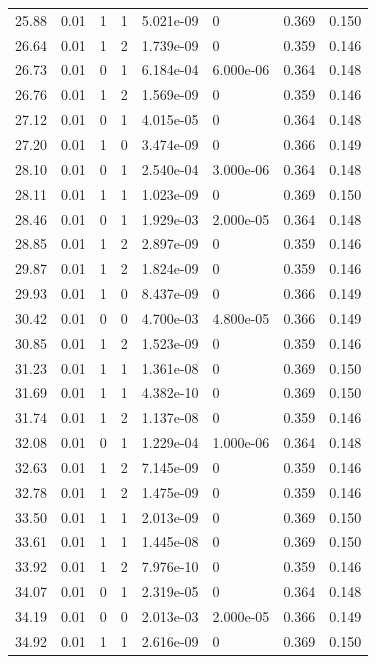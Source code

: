 \documentclass[preview]{standalone}
\begin{document}
{{{\begin{tabular}{L{1.2cm}C{1.2cm} C{0.3cm}C{0.5cm} C{1.4cm}C{1.4cm} C{1.4cm}C{1.4cm}}
  25.88  &  0.01  & 1     &  1 &  5.021e-09  & 0  & 0.369 &  0.150   \\ 
  26.64  &  0.01  & 1     &  2 &  1.739e-09  & 0  & 0.359 &  0.146   \\ 
  26.73  &  0.01  & 0     &  1 &  6.184e-04  & 6.000e-06  & 0.364 &  0.148   \\ 
  26.76  &  0.01  & 1     &  2 &  1.569e-09  & 0  & 0.359 &  0.146   \\ 
  27.12  &  0.01  & 0     &  1 &  4.015e-05  & 0  & 0.364 &  0.148   \\ 
  27.20  &  0.01  & 1     &  0 &  3.474e-09  & 0  & 0.366 &  0.149   \\ 
  28.10  &  0.01  & 0     &  1 &  2.540e-04  & 3.000e-06  & 0.364 &  0.148   \\ 
  28.11  &  0.01  & 1     &  1 &  1.023e-09  & 0  & 0.369 &  0.150   \\ 
  28.46  &  0.01  & 0     &  1 &  1.929e-03  & 2.000e-05  & 0.364 &  0.148   \\ 
  28.85  &  0.01  & 1     &  2 &  2.897e-09  & 0  & 0.359 &  0.146   \\ 
  29.87  &  0.01  & 1     &  2 &  1.824e-09  & 0  & 0.359 &  0.146   \\ 
  29.93  &  0.01  & 1     &  0 &  8.437e-09  & 0  & 0.366 &  0.149   \\ 
  30.42  &  0.01  & 0     &  0 &  4.700e-03  & 4.800e-05  & 0.366 &  0.149   \\ 
  30.85  &  0.01  & 1     &  2 &  1.523e-09  & 0  & 0.359 &  0.146   \\ 
  31.23  &  0.01  & 1     &  1 &  1.361e-08  & 0  & 0.369 &  0.150   \\ 
  31.69  &  0.01  & 1     &  1 &  4.382e-10  & 0  & 0.369 &  0.150   \\ 
  31.74  &  0.01  & 1     &  2 &  1.137e-08  & 0  & 0.359 &  0.146   \\ 
  32.08  &  0.01  & 0     &  1 &  1.229e-04  & 1.000e-06  & 0.364 &  0.148   \\ 
  32.63  &  0.01  & 1     &  2 &  7.145e-09  & 0  & 0.359 &  0.146   \\ 
  32.78  &  0.01  & 1     &  2 &  1.475e-09  & 0  & 0.359 &  0.146   \\ 
  33.50  &  0.01  & 1     &  1 &  2.013e-09  & 0  & 0.369 &  0.150   \\ 
  33.61  &  0.01  & 1     &  1 &  1.445e-08  & 0  & 0.369 &  0.150   \\ 
  33.92  &  0.01  & 1     &  2 &  7.976e-10  & 0  & 0.359 &  0.146   \\ 
  34.07  &  0.01  & 0     &  1 &  2.319e-05  & 0  & 0.364 &  0.148   \\ 
  34.19  &  0.01  & 0     &  0 &  2.013e-03  & 2.000e-05  & 0.366 &  0.149   \\ 
  34.92  &  0.01  & 1     &  1 &  2.616e-09  & 0  & 0.369 &  0.150   \\ 
\hline 
\end{tabular} 

}}}
\end{document}
